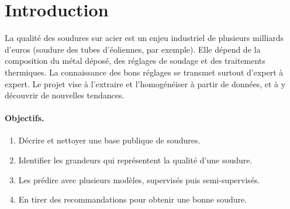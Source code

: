 \section{Introduction}

La qualité des soudures sur acier est un enjeu industriel de plusieurs milliards d'euros
(soudure des tubes d'éoliennes, par exemple). Elle dépend de la composition du métal
déposé, des réglages de soudage et des traitements thermiques. La connaissance des bons
réglages se transmet surtout d'expert à expert. Le projet vise à l'extraire et
l'homogénéiser à partir de données, et à y découvrir de nouvelles tendances.

\paragraph{Objectifs.}
\begin{enumerate}
  \item Décrire et nettoyer une base publique de soudures.
  \item Identifier les grandeurs qui représentent la qualité d'une soudure.
  \item Les prédire avec plusieurs modèles, supervisés puis semi-supervisés.
  \item En tirer des recommandations pour obtenir une bonne soudure.
\end{enumerate}

